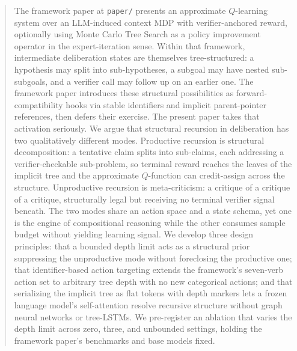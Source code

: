 \begin{abstract}
The framework paper at \texttt{paper/} presents an approximate $Q$-learning
system over an LLM-induced context MDP with verifier-anchored reward,
optionally using Monte Carlo Tree Search as a policy improvement operator
in the expert-iteration sense. Within that framework, intermediate
deliberation states are themselves tree-structured: a hypothesis may split
into sub-hypotheses, a subgoal may have nested sub-subgoals, and a
verifier call may follow up on an earlier one. The framework paper
introduces these structural possibilities as forward-compatibility hooks
via stable identifiers and implicit parent-pointer references, then
defers their exercise. The present paper takes that activation seriously.
We argue that structural recursion in deliberation has two qualitatively
different modes. Productive recursion is structural decomposition: a
tentative claim splits into sub-claims, each addressing a
verifier-checkable sub-problem, so terminal reward reaches the leaves of
the implicit tree and the approximate $Q$-function can credit-assign
across the structure. Unproductive recursion is meta-criticism: a
critique of a critique of a critique, structurally legal but receiving
no terminal verifier signal beneath. The two modes share an action space
and a state schema, yet one is the engine of compositional reasoning
while the other consumes sample budget without yielding learning signal.
We develop three design principles: that a bounded depth limit acts as
a structural prior suppressing the unproductive mode without foreclosing
the productive one; that identifier-based action targeting extends the
framework's seven-verb action set to arbitrary tree depth with no new
categorical actions; and that serializing the implicit tree as flat
tokens with depth markers lets a frozen language model's self-attention
resolve recursive structure without graph neural networks or
tree-LSTMs. We pre-register an ablation that varies the depth limit
across zero, three, and unbounded settings, holding the framework
paper's benchmarks and base models fixed.
\end{abstract}
